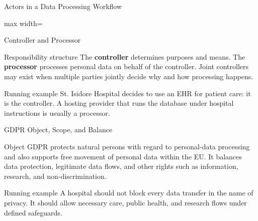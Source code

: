 \documentclass[presentation]{beamer}
\newcommand{\scenario}{St. Isidore Hospital}
\begin{document}
\begin{frame}[c]{Actors in a Data Processing Workflow}
\begin{center}
\begin{adjustbox}{max width=\textwidth}
\end{adjustbox}
\end{center}
\end{frame}

\begin{frame}[c]{Controller and Processor}
\begin{block}{Responsibility structure}
The \textbf{controller} determines purposes and means. The \textbf{processor} processes personal data
on behalf of the controller. Joint controllers may exist when multiple parties jointly decide why and
how processing happens.
\end{block}

\begin{exampleblock}{Running example}
\scenario{} decides to use an EHR for patient care: it is the controller. A hosting provider that
runs the database under hospital instructions is usually a processor.
\end{exampleblock}
\end{frame}

\begin{frame}[c]{GDPR Object, Scope, and Balance}
\begin{block}{Object}
GDPR protects natural persons with regard to personal-data processing and also supports free
movement of personal data within the EU. It balances data protection, legitimate data flows, and
other rights such as information, research, and non-discrimination.
\end{block}

\begin{exampleblock}{Running example}
A hospital should not block every data transfer in the name of privacy. It should allow necessary
care, public health, and research flows under defined safeguards.
\end{exampleblock}
\end{frame}
\end{document}
